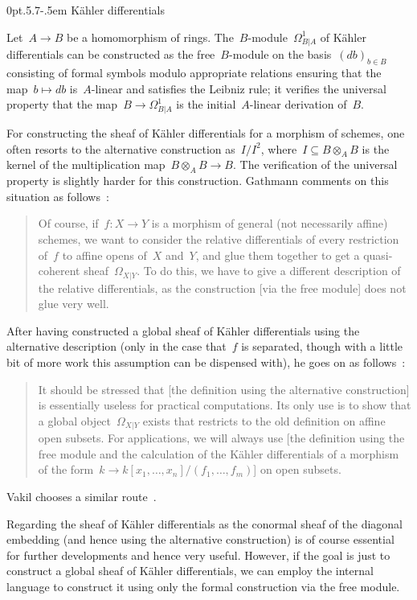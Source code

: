 \documentclass[10pt,reqno,a4paper]{amsbook}
\makeatletter
\theoremstyle{definition}
\theoremstyle{plain}
\theoremstyle{remark}
\newcommand{\?}{\,{:}\,}
\renewcommand{\_}{\mathpunct{.}\,}
\def\subsection{\@startsection{subsection}{2}%
  {0pt}{.5\linespacing\@plus.7\linespacing}{-.5em}%
  {\normalfont\bfseries}}
\makeatother
\begin{document}
\subsection{Kähler differentials}

Let~$A \to B$ be a homomorphism of rings. The~$B$-module~$\Omega^1_{B|A}$ of
Kähler differentials can be constructed as the free~$B$-module on the
basis~$(db)_{b \in B}$ consisting of formal symbols modulo appropriate
relations ensuring that the map~$b \mapsto db$ is~$A$-linear and satisfies the
Leibniz rule; it verifies the universal property that the map~$B \to
\Omega^1_{B|A}$ is the initial~$A$-linear derivation of~$B$.

For constructing the sheaf of Kähler differentials for a morphism of schemes,
one often resorts to the alternative construction as~$I/I^2$, where~$I
\subseteq B \otimes_A B$ is the kernel of the multiplication map~$B \otimes_A B
\to B$. The verification of the universal property is slightly harder for this
construction. Gathmann comments on this situation as follows~\cite[p.~134]{gathmann:ag}:
\begin{quote}
Of course, if~$f : X \to Y$ is a morphism of general (not necessarily affine)
schemes, we want to consider the relative differentials of every restriction
of~$f$ to affine opens of~$X$ and~$Y$, and glue them together to get a quasi-coherent
sheaf~$\Omega_{X|Y}$. To do this, we have to give a different description of the relative
differentials, as the construction [via the free module] does not glue very well.
\end{quote}
After having constructed a global sheaf of Kähler differentials using the
alternative description (only in the case that~$f$ is separated, though with a
little bit of more work this assumption can be dispensed with), he goes on as
follows~\cite[Remark~7.4.8]{gathmann:ag}:
\begin{quote}
It should be stressed that [the definition using the alternative construction]
is essentially useless for practical computations. Its only use is to show that
a global object~$\Omega_{X|Y}$ exists that restricts to the old definition on
affine open subsets. For applications, we will always use [the definition using
the free module and the calculation of the Kähler differentials of a morphism
of the form~$k \to k[x_1,\ldots,x_n]/(f_1,\ldots,f_m)$] on open subsets.
\end{quote}
Vakil chooses a similar route~\cite[Section~21.2]{vakil:foag}.

Regarding the sheaf of Kähler differentials as the conormal sheaf of the
diagonal embedding (and hence using the alternative construction) is of course
essential for further developments and hence very useful. However, if the goal
is just to construct a global sheaf of Kähler differentials, we can employ the
internal language to construct it using only the formal construction via the
free module.
\end{document}
